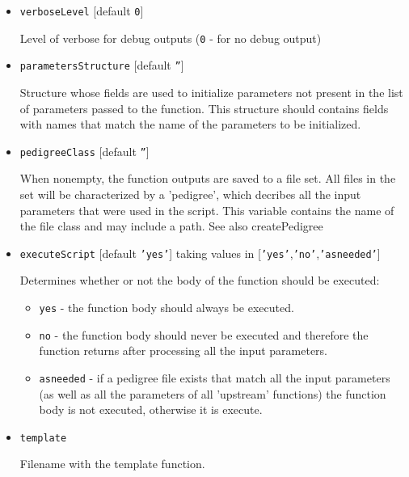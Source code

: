 \begin{itemize}
\item \texttt{verboseLevel} [default \texttt{0}]

   Level of verbose for debug outputs (\texttt{0} - for no debug output)

\item \texttt{parametersStructure} [default \texttt{''}]

   Structure whose fields are used to initialize parameters   
not present in the list of parameters passed to the function.   
This structure should contains fields with names that match   
the name of the parameters to be initialized.

\item \texttt{pedigreeClass} [default \texttt{''}]

   When nonempty, the function outputs are saved to a file set.   
All files in the set will be characterized by a 'pedigree',   
which decribes all the input parameters that were used in the script.   
This variable contains the name of the file class and may include a path.   
See also createPedigree

\item \texttt{executeScript} [default \texttt{'yes'}] taking values in [\texttt{'yes'},\texttt{'no'},\texttt{'asneeded'}]

   Determines whether or not the body of the function should be executed:   
\begin{itemize}
      
\item \texttt{yes} - the function body should always be executed.      
\item \texttt{no}  - the function body should never be executed and therefore the      
          function returns after processing all the input parameters.      
\item \texttt{asneeded} - if a pedigree file exists that match all the input parameters      
               (as well as all the parameters of all 'upstream' functions)      
               the function body is not executed, otherwise it is execute.\end{itemize}


\item \texttt{template}

   Filename with the template function.   
    

\end{itemize}
